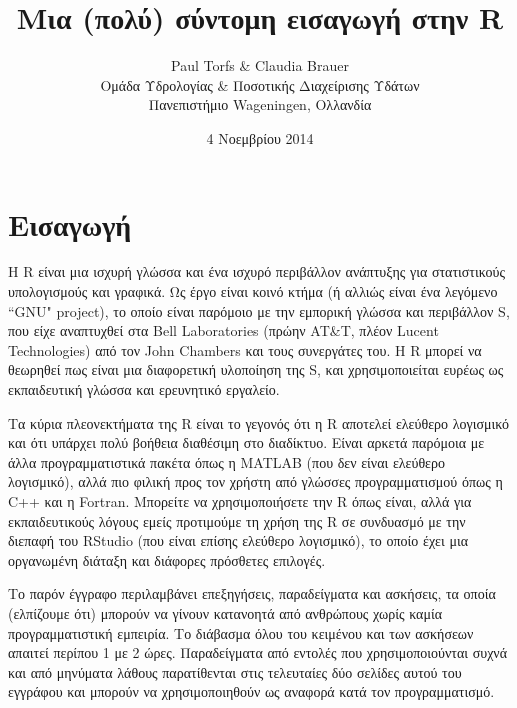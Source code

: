 \documentclass[a4paper,10pt,twocolumn]{article}
\title{\vspace{-13mm} \textbf{Μια (πολύ) σύντομη εισαγωγή στην R}}
\author{Paul Torfs \& Claudia Brauer\\
\small{Ομάδα Υδρολογίας \& Ποσοτικής Διαχείρισης Υδάτων}\\
\small{Πανεπιστήμιο Wageningen, Ολλανδία}}
\date{\small{4 Νοεμβρίου 2014}}
\begin{document}
\maketitle

\section{Εισαγωγή}

Η R είναι μια ισχυρή γλώσσα και ένα ισχυρό περιβάλλον ανάπτυξης για στατιστικούς
υπολογισμούς και γραφικά. Ως έργο είναι κοινό κτήμα (ή αλλιώς είναι ένα λεγόμενο ``GNU" project),
το οποίο είναι παρόμοιο με την εμπορική γλώσσα και περιβάλλον S, που είχε αναπτυχθεί στα Bell 
Laboratories (πρώην AT\&T, πλέον Lucent Technologies) από τον John Chambers και τους συνεργάτες
του. Η R μπορεί να θεωρηθεί πως είναι μια διαφορετική υλοποίηση της S, και χρησιμοποιείται ευρέως
ως εκπαιδευτική γλώσσα και ερευνητικό εργαλείο.

Τα κύρια πλεονεκτήματα της R είναι το γεγονός ότι η R αποτελεί ελεύθερο λογισμικό και ότι υπάρχει
πολύ βοήθεια διαθέσιμη στο διαδίκτυο. Είναι αρκετά παρόμοια με άλλα προγραμματιστικά πακέτα όπως 
η MATLAB (που δεν είναι ελεύθερο λογισμικό), αλλά πιο φιλική προς τον χρήστη από γλώσσες
προγραμματισμού όπως η C++ και η Fortran. Μπορείτε να χρησιμοποιήσετε την R όπως είναι, αλλά για
εκπαιδευτικούς λόγους εμείς προτιμούμε τη χρήση της R σε συνδυασμό με την διεπαφή του RStudio
(που είναι επίσης ελεύθερο λογισμικό), το οποίο έχει μια οργανωμένη διάταξη και διάφορες πρόσθετες
επιλογές.

Το παρόν έγγραφο περιλαμβάνει επεξηγήσεις, παραδείγματα και ασκήσεις, τα οποία (ελπίζουμε ότι)
μπορούν να γίνουν κατανοητά από ανθρώπους χωρίς καμία προγραμματιστική εμπειρία. Το διάβασμα
όλου του κειμένου και των ασκήσεων απαιτεί περίπου 1 με 2 ώρες. Παραδείγματα από εντολές που 
χρησιμοποιούνται συχνά και από μηνύματα λάθους παρατίθενται στις τελευταίες δύο σελίδες αυτού
του εγγράφου και μπορούν να χρησιμοποιηθούν ως αναφορά κατά τον προγραμματισμό.

\end{document}
